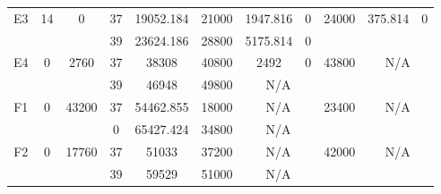 \begin{sidewaystable}
\begin{tabular}{c||c|c||c|c|c|c|c||c|c|c}
         &
        
      \\
      \hline
      \multirow{2}{*}{E3} &
      \multirow{2}{*}{14} &
      \multirow{2}{*}{0} &
      37 &
      19052.184 &
      21000 &
        1947.816 &
        0 &
      \multirow{2}{*}{24000} &
        \multirow{2}{*}{375.814} &
        \multirow{2}{*}{0}
      \\
      \cline{4-8}
       &
       &
       &
      39 &
      23624.186 &
      28800 &
        5175.814 &
        0 &
      
         &
        
      \\
      \hline
      \multirow{2}{*}{E4} &
      \multirow{2}{*}{0} &
      \multirow{2}{*}{2760} &
      37 &
      38308 &
      40800 &
        2492 &
        0 &
      \multirow{2}{*}{43800} &
        \multicolumn{2}{c}{\multirow{2}{*}{N/A}}
      \\
      \cline{4-8}
       &
       &
       &
      39 &
      46948 &
      49800 &
        \multicolumn{2}{|c||}{N/A} &
      
        
      \\
      \hline
      \multirow{2}{*}{F1} &
      \multirow{2}{*}{0} &
      \multirow{2}{*}{43200} &
      37 &
      54462.855 &
      18000 &
        \multicolumn{2}{|c||}{N/A} &
      \multirow{2}{*}{23400} &
        \multicolumn{2}{c}{\multirow{2}{*}{N/A}}
      \\
      \cline{4-8}
       &
       &
       &
      0 &
      65427.424 &
      34800 &
        \multicolumn{2}{|c||}{N/A} &
      
        
      \\
      \hline
      \multirow{2}{*}{F2} &
      \multirow{2}{*}{0} &
      \multirow{2}{*}{17760} &
      37 &
      51033 &
      37200 &
        \multicolumn{2}{|c||}{N/A} &
      \multirow{2}{*}{42000} &
        \multicolumn{2}{c}{\multirow{2}{*}{N/A}}
      \\
      \cline{4-8}
       &
       &
       &
      39 &
      59529 &
      51000 &
        \multicolumn{2}{|c||}{N/A} &
      
        
      \\
\end{tabular}
\label{table:RDS3.txt-10563.tex} 
\end{sidewaystable}